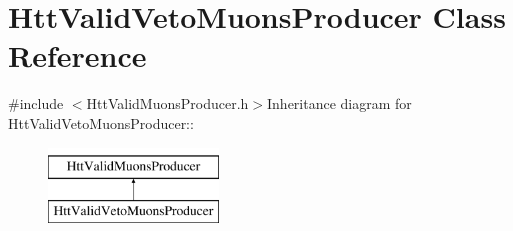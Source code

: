 \hypertarget{classHttValidVetoMuonsProducer}{
\section{HttValidVetoMuonsProducer Class Reference}
\label{classHttValidVetoMuonsProducer}
}


{\ttfamily \#include $<$HttValidMuonsProducer.h$>$}Inheritance diagram for HttValidVetoMuonsProducer::\begin{figure}[H]
\begin{center}
\leavevmode
\includegraphics[height=2cm]{classHttValidVetoMuonsProducer}
\end{center}
\end{figure}
